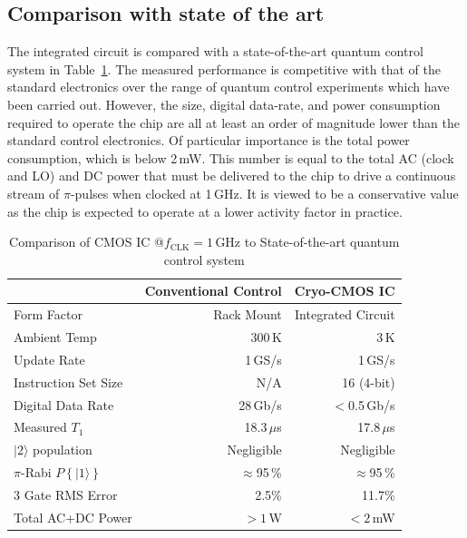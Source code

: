 \documentclass[journal]{IEEEtran}
\newcommand{\CR}[1]{{\color{black}#1}}
\begin{document}
\subsection{Comparison with state of the art}
The integrated circuit is compared with a state-of-the-art quantum control system in Table~\ref{comptab}. The measured performance is competitive with that of the standard electronics \CR{over the range of quantum control experiments which have been carried out}. However, the size, digital data-rate, and power consumption required to operate the chip are all at least an order of magnitude lower than the standard \CR{control} electronics. Of particular importance is the total power consumption, which is below 2\,mW. This number is equal to the total AC \CR{(clock and LO)} and DC power that must be delivered to the chip to drive a continuous stream of $\pi$-pulses when clocked at 1\,GHz. It is viewed to be a conservative value as the chip is expected to operate at a lower activity factor in practice. 
\begin{table}[bt!]
\caption{Comparison of CMOS IC @$f_\text{CLK}=1\,$GHz to State-of-the-art quantum control system }
\label{comptab}
\centering
\begin{tabular}{lrr}
\toprule
&Conventional Control&Cryo-CMOS IC\\
\midrule
Form Factor&Rack Mount&Integrated Circuit\\
\CR{Ambient} Temp&300\,K&3\,K\\
Update Rate&1\,GS/s&1\,GS/s\\
Instruction Set Size&N/A&16 (4-bit)\\
Digital Data Rate&28\,Gb/s&$<$0.5\,Gb/s\\
Measured $T_\text{1}$&18.3\,$\mu$s&17.8$\,\mu$s\\
$|2\rangle$ population&Negligible&Negligible\\
$\pi$-Rabi $P\left\{|1\rangle\right\}$&$\approx$95\,\%&$\approx$95\,\%\\
3 Gate RMS Error&2.5\%&11.7\%\\
Total AC+DC Power&$>1$\,W&$<2$\,mW\\
\bottomrule
\end{tabular}
\end{table}
\end{document}
